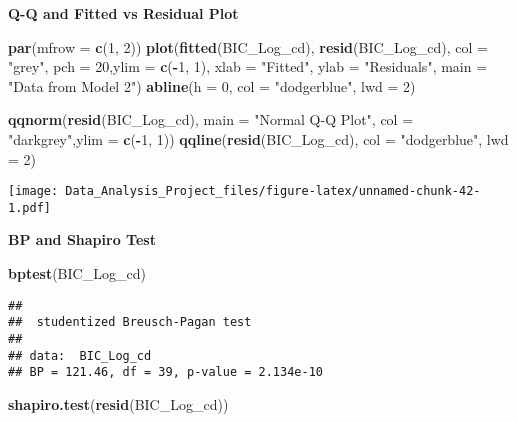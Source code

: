 \documentclass[]{article}
\newenvironment{Shaded}{\begin{snugshade}}{\end{snugshade}}
\newcommand{\KeywordTok}[1]{\textcolor[rgb]{0.13,0.29,0.53}{\textbf{#1}}}
\newcommand{\DataTypeTok}[1]{\textcolor[rgb]{0.13,0.29,0.53}{#1}}
\newcommand{\DecValTok}[1]{\textcolor[rgb]{0.00,0.00,0.81}{#1}}
\newcommand{\StringTok}[1]{\textcolor[rgb]{0.31,0.60,0.02}{#1}}
\newcommand{\OperatorTok}[1]{\textcolor[rgb]{0.81,0.36,0.00}{\textbf{#1}}}
\newcommand{\NormalTok}[1]{#1}
\begin{document}
\textbf{Q-Q and Fitted vs Residual Plot}

\begin{Shaded}
\begin{Highlighting}[]
 \KeywordTok{par}\NormalTok{(}\DataTypeTok{mfrow =} \KeywordTok{c}\NormalTok{(}\DecValTok{1}\NormalTok{, }\DecValTok{2}\NormalTok{))}
\KeywordTok{plot}\NormalTok{(}\KeywordTok{fitted}\NormalTok{(BIC_Log_cd), }\KeywordTok{resid}\NormalTok{(BIC_Log_cd), }\DataTypeTok{col =} \StringTok{"grey"}\NormalTok{, }\DataTypeTok{pch =} \DecValTok{20}\NormalTok{,}\DataTypeTok{ylim =} \KeywordTok{c}\NormalTok{(}\OperatorTok{-}\DecValTok{1}\NormalTok{, }\DecValTok{1}\NormalTok{),}
    \DataTypeTok{xlab =} \StringTok{"Fitted"}\NormalTok{, }\DataTypeTok{ylab =} \StringTok{"Residuals"}\NormalTok{, }\DataTypeTok{main =} \StringTok{"Data from Model 2"}\NormalTok{)}
\KeywordTok{abline}\NormalTok{(}\DataTypeTok{h =} \DecValTok{0}\NormalTok{, }\DataTypeTok{col =} \StringTok{"dodgerblue"}\NormalTok{, }\DataTypeTok{lwd =} \DecValTok{2}\NormalTok{)}

\KeywordTok{qqnorm}\NormalTok{(}\KeywordTok{resid}\NormalTok{(BIC_Log_cd), }\DataTypeTok{main =} \StringTok{"Normal Q-Q Plot"}\NormalTok{, }\DataTypeTok{col =} \StringTok{"darkgrey"}\NormalTok{,}\DataTypeTok{ylim =} \KeywordTok{c}\NormalTok{(}\OperatorTok{-}\DecValTok{1}\NormalTok{, }\DecValTok{1}\NormalTok{))}
\KeywordTok{qqline}\NormalTok{(}\KeywordTok{resid}\NormalTok{(BIC_Log_cd), }\DataTypeTok{col =} \StringTok{"dodgerblue"}\NormalTok{, }\DataTypeTok{lwd =} \DecValTok{2}\NormalTok{)}
\end{Highlighting}
\end{Shaded}

\texttt{[image: Data\_Analysis\_Project\_files/figure-latex/unnamed-chunk-42-1.pdf]}

\textbf{BP and Shapiro Test }

\begin{Shaded}
\begin{Highlighting}[]
\KeywordTok{bptest}\NormalTok{(BIC_Log_cd)}
\end{Highlighting}
\end{Shaded}

\begin{verbatim}
## 
##  studentized Breusch-Pagan test
## 
## data:  BIC_Log_cd
## BP = 121.46, df = 39, p-value = 2.134e-10
\end{verbatim}

\begin{Shaded}
\begin{Highlighting}[]
\KeywordTok{shapiro.test}\NormalTok{(}\KeywordTok{resid}\NormalTok{(BIC_Log_cd))}
\end{Highlighting}
\end{Shaded}
\end{document}
